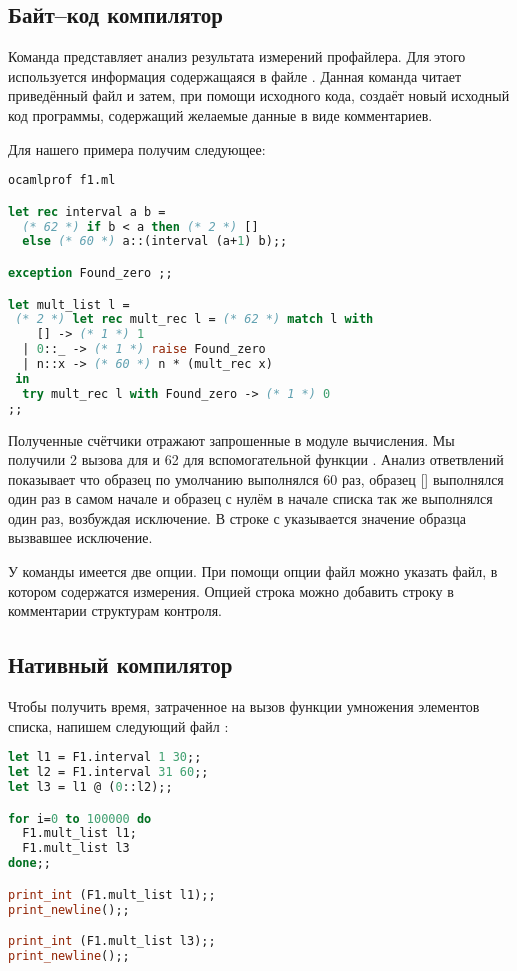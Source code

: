 \subsection {Байт--код компилятор}
\label{subsubsec:bytecode_compiler}

Команда  представляет анализ результата измерений профайлера. 
Для этого используется информация содержащаяся в файле . 
Данная команда читает приведённый файл и затем, при помощи исходного кода, 
создаёт новый исходный код программы, содержащий желаемые данные в виде 
комментариев.

Для нашего примера получим следующее:

\begin{lstlisting}[language=OCaml]
ocamlprof f1.ml

let rec interval a b = 
  (* 62 *) if b < a then (* 2 *) []
  else (* 60 *) a::(interval (a+1) b);;

exception Found_zero ;; 

let mult_list l = 
 (* 2 *) let rec mult_rec l = (* 62 *) match l with 
    [] -> (* 1 *) 1
  | 0::_ -> (* 1 *) raise Found_zero
  | n::x -> (* 60 *) n * (mult_rec x)
 in
  try mult_rec l with Found_zero -> (* 1 *) 0
;; 
\end{lstlisting}

Полученные счётчики отражают запрошенные в модуле  вычисления. Мы 
получили 2 вызова для  и 62 для вспомогательной функции 
. Анализ ответвлений  показывает что образец по 
умолчанию выполнялся 60 раз, образец [] выполнялся один раз в самом начале и 
образец с нулём в начале списка так же выполнялся один раз, возбуждая 
исключение. В строке с  указывается значение образца вызвавшее 
исключение.

У команды  имеется две опции. При помощи опции  файл 
можно указать файл, в котором содержатся измерения. Опцией  строка 
можно добавить строку в комментарии структурам контроля.

\subsection {Нативный компилятор}
\label{subsubsec:native_compilation}

Чтобы получить время, затраченное на вызов функции умножения элементов списка, 
напишем следующий файл :

\begin{lstlisting}[language=OCaml]
let l1 = F1.interval 1 30;;
let l2 = F1.interval 31 60;;
let l3 = l1 @ (0::l2);;

for i=0 to 100000 do 
  F1.mult_list l1;
  F1.mult_list l3
done;;

print_int (F1.mult_list l1);;
print_newline();;

print_int (F1.mult_list l3);;
print_newline();;
\end{lstlisting}

